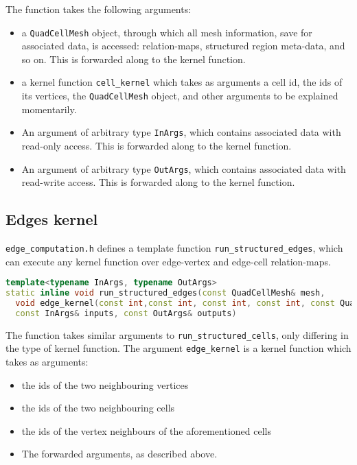 The function takes the following arguments:
\begin{itemize}
\item a \lstinline|QuadCellMesh| object, through which all mesh information, save for associated data, is accessed: relation-maps, structured region meta-data, and so on. This is forwarded along to the kernel function.
\item a kernel function \lstinline|cell_kernel| which takes as arguments a cell id, the ids of its vertices, the \lstinline|QuadCellMesh| object, and other arguments to be explained momentarily.
\item An argument of arbitrary type \lstinline|InArgs|, which contains associated data with read-only access. This is forwarded along to the kernel function.
\item An argument of arbitrary type \lstinline|OutArgs|, which contains associated data with read-write access. This is forwarded along to the kernel function.
\end{itemize}


\subsection{Edges kernel}
\texttt{edge\_computation.h} defines a template function \lstinline|run_structured_edges|, which can execute any kernel function over edge-vertex and edge-cell relation-maps.

\begin{lstlisting}[language=c++]
template<typename InArgs, typename OutArgs>
static inline void run_structured_edges(const QuadCellMesh& mesh,
  void edge_kernel(const int,const int, const int, const int, const QuadNeighbours&, const QuadNeighbours&, const int, const QuadCellMesh&, const InArgs&, const OutArgs&),
  const InArgs& inputs, const OutArgs& outputs)
\end{lstlisting}

The function takes similar arguments to \lstinline|run_structured_cells|, only differing in the type of kernel function. The argument \lstinline|edge_kernel| is a kernel function which takes as arguments:
\begin{itemize}
\item the ids of the two neighbouring vertices
\item the ids of the two neighbouring cells
\item the ids of the vertex neighbours of the aforementioned cells
\item The forwarded arguments, as described above.
\end{itemize}


